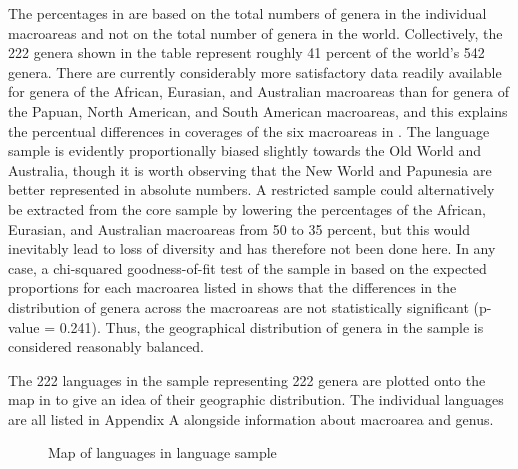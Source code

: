 The percentages in  are based on the total numbers of genera in the individual macroareas and not on the total number of genera in the world. Collectively, the 222 genera shown in the table represent roughly 41 percent of the world’s 542 genera. There are currently considerably more satisfactory data readily available for genera of the African, Eurasian, and Australian macroareas than for genera of the Papuan, North American, and South American macroareas, and this  \citep[106f.]{bakker:2010} explains the percentual differences in coverages of the six macroareas in . The language sample is evidently proportionally biased slightly towards the Old World and Australia, though it is worth observing that the New World and Papunesia are better represented in absolute numbers. A restricted sample \citep[250f.]{miestamo:al:2016} could alternatively be extracted from the core sample by lowering the percentages of the African, Eurasian, and Australian macroareas from 50 to 35 percent, but this would inevitably lead to loss of diversity and has therefore not been done here. In any case, a chi-squared goodness-of-fit test of the sample in  based on the expected proportions for each macroarea listed in  shows that the differences in the distribution of genera across the macroareas are not statistically significant (p-value = 0.241). Thus, the geographical distribution of genera in the sample is considered reasonably balanced. 

The 222 languages in the sample representing 222 genera are plotted onto the map in  to give an idea of their geographic distribution. The individual languages are all listed in Appendix A alongside information about macroarea and genus. 


\begin{sidewaysfigure}
	\centering
	\def\svgwidth{\textwidth}
	
	\caption{Map of languages in language sample}
	\label{fig:ch1:map}
\end{sidewaysfigure}

